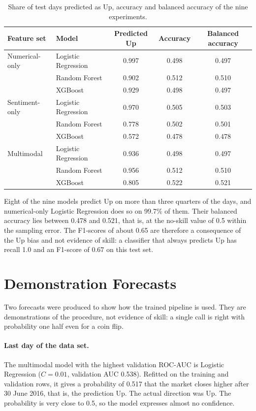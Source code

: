 \begin{table}[!htbp]
\centering
\small
\begin{tabular}{@{}llccc@{}}
\toprule
Feature set & Model & Predicted Up & Accuracy & Balanced accuracy \\
\midrule
Numerical-only & Logistic Regression & 0.997 & 0.498 & 0.497 \\
 & Random Forest & 0.902 & 0.512 & 0.510 \\
 & XGBoost & 0.929 & 0.498 & 0.497 \\
\midrule
Sentiment-only & Logistic Regression & 0.970 & 0.505 & 0.503 \\
 & Random Forest & 0.778 & 0.502 & 0.501 \\
 & XGBoost & 0.572 & 0.478 & 0.478 \\
\midrule
Multimodal & Logistic Regression & 0.936 & 0.498 & 0.497 \\
 & Random Forest & 0.956 & 0.512 & 0.510 \\
 & XGBoost & 0.805 & 0.522 & 0.521 \\
\bottomrule
\end{tabular}
\caption{Share of test days predicted as Up, accuracy and balanced accuracy of the nine experiments.}
\label{tab:bias}
\end{table}

Eight of the nine models predict Up on more than three quarters of the days, and numerical-only Logistic Regression does so on 99.7\% of them. Their balanced accuracy lies between 0.478 and 0.521, that is, at the no-skill value of 0.5 within the sampling error. The F1-scores of about 0.65 are therefore a consequence of the Up bias and not evidence of skill: a classifier that always predicts Up has recall 1.0 and an F1-score of 0.67 on this test set.

\section{Demonstration Forecasts}
\label{sec:forecast}
Two forecasts were produced to show how the trained pipeline is used. They are demonstrations of the procedure, not evidence of skill: a single call is right with probability one half even for a coin flip.

\paragraph{Last day of the data set.} The multimodal model with the highest validation ROC-AUC is Logistic Regression ($C=0.01$, validation AUC 0.538). Refitted on the training and validation rows, it gives a probability of 0.517 that the market closes higher after 30 June 2016, that is, the prediction Up. The actual direction was Up. The probability is very close to 0.5, so the model expresses almost no confidence.

